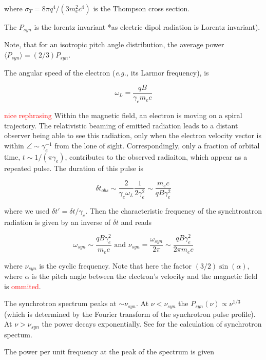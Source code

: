 \documentclass[11pt,a4paper,headinclude=true,DIV=14,BCOR=8mm,chapterprefix,listof=totoc,twoside,openright,abstracton]{scrbook}
\newcommand{\red}[1]{\textcolor{red}{#1}}
\begin{document}
where $\sigma_T = 8\pi q^4 / (3m_e^2c^4)$ is the Thompson cross section. 

The $P_{syn}$ is the lorentz invariant *as electric dipol radiation is Lorentz invariant).

Note, that for an isotropic pitch angle distribution, the average power $\langle P_{syn} \rangle = (2/3)P_{syn}$.

The angular speed of the electron (\textit{e.g.,} its Larmor frequency), is

\begin{equation}
    \omega_L = \frac{q B}{\gamma_e m_e c}
\end{equation}

\red{nice rephrasing}
Within the magnetic field, an electron is moving on a spiral trajectory. 
The relativistic beaming of emitted radiation leads to a distant observer being able to see this radiation, only when the electron velocity vector is within $\angle \sim \gamma_e^{-1}$ from the lone of sight. Correspondingly, only a fraction of orbital time, $t\sim1/(\pi\gamma_e)$, contributes to the observed radiaiton, which appear as a repeated pulse. The duration of this pulse is

\begin{equation}
    \delta t_{obs} \sim \frac{2}{\gamma_e \omega_L}\frac{1}{2\gamma_e^2}\sim \frac{m_e c}{q B \gamma_e^2}
\end{equation}

where we used $\delta t' = \delta t / \gamma_e$. 
Then the characteristic frequency of the synchtrontron radiation is given by an inverse of $\delta t$ and reads 

\begin{equation}
    \omega_{syn} \sim \frac{q B \gamma_e^2}{m_e c} \text{ and } \nu_{syn} = \frac{\omega_{syn}}{2\pi} \sim \frac{q B \gamma_e^2}{2\pi m_e c}
\end{equation}

where $\nu_{syn}$ is the cyclic frequency.
Note that here the factor $(3/2)\sin(\alpha)$, where $\alpha$ is the pitch angle between the electron's velocity and the magnetic field is \red{ommited}.

The synchrotron spectrum peaks at $\sim \nu_{syn}$. At $\nu < \nu_{syn}$ the $P_{syn}(\nu)\propto\nu^{1/3}$ (which is determined by the Fourier transform of the synchrotron pulse profile). At $\nu > \nu_{syn}$ the power decays exponentially. See \cite{RubicyLightman1979} for the calculation of synchrotron spectum.

The power per unit frequency at the peak of the spectrum is given 
\end{document}
